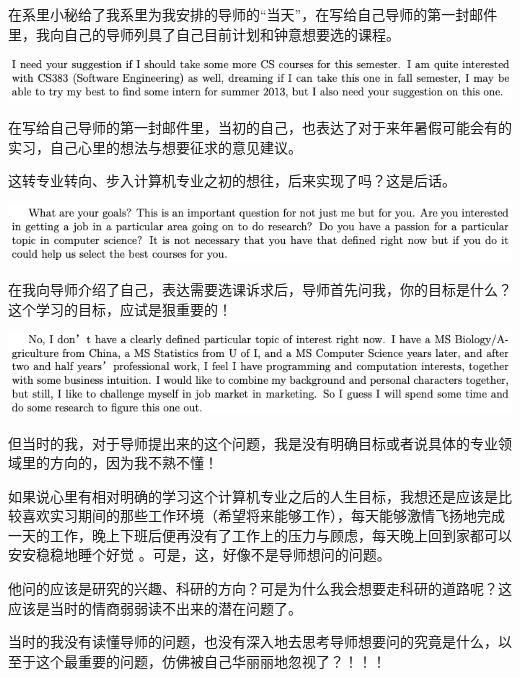 \documentclass[9pt, b5paper]{article}
\begin{document}
在系里小秘给了我系里为我安排的导师的“当天”，在写给自己导师的第一封邮件里，我向自己的导师列具了自己目前计划和钟意想要选的课程。

\begin{center}
\includegraphics[width=.9\linewidth]{./pic/backups_plans_20210421_123603.png}
\end{center}

在写给自己导师的第一封邮件里，当初的自己，也表达了对于来年暑假可能会有的实习，自己心里的想法与想要征求的意见建议。

这转专业转向、步入计算机专业之初的想往，后来实现了吗？这是后话。 

\begin{center}
\includegraphics[width=.9\linewidth]{./pic/backups_plans_20210421_125334.png}
\end{center}

在我向导师介绍了自己，表达需要选课诉求后，导师首先问我，你的目标是什么？这个学习的目标，应试是狠重要的！

\begin{center}
\includegraphics[width=.9\linewidth]{./pic/backups_plans_20210419_084838.png}
\end{center}

但当时的我，对于导师提出来的这个问题，我是没有明确目标或者说具体的专业领域里的方向的，因为我不熟不懂！

如果说心里有相对明确的学习这个计算机专业之后的人生目标，我想还是应该是比较喜欢实习期间的那些工作环境（希望将来能够工作），每天能够激情飞扬地完成一天的工作，晚上下班后便再没有了工作上的压力与顾虑，每天晚上回到家都可以安安稳稳地睡个好觉 。可是，这，好像不是导师想问的问题。

他问的应该是研究的兴趣、科研的方向？可是为什么我会想要走科研的道路呢？这应该是当时的情商弱弱读不出来的潜在问题了。 

当时的我没有读懂导师的问题，也没有深入地去思考导师想要问的究竟是什么，以至于这个最重要的问题，仿佛被自己华丽丽地忽视了？！！！
\end{document}

